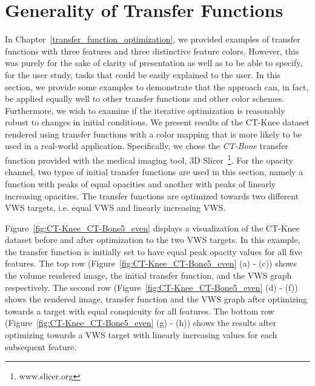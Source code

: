 \chapter{Generality of Transfer Functions \label{Generality_of_TF}}

In Chapter~\ref{transfer_function_optimization}, we provided examples of transfer functions with three features and three distinctive feature colors. However, this was 
purely for the sake of clarity of presentation as well as to be able to specify, for the user study, tasks that could be easily explained to the user. In this section, we provide some examples to demonstrate that the approach can, in fact, be applied equally well to other transfer functions and other color schemes. Furthermore, we wish to examine if the iterative optimization is reasonably robust to changes in initial conditions. 
We present results of the CT-Knee dataset rendered using transfer functions with a color mapping that is more likely to be used in a real-world application. Specifically, we chose the \emph{CT-Bone} transfer function provided with the medical imaging tool, 3D Slicer~\footnote{www.slicer.org}. For the opacity channel, two types of initial transfer functions are used in this section, namely a function with peaks of equal opacities and another with peaks of linearly increasing opacities. The transfer functions are optimized towards two different VWS targets, i.e. equal VWS and linearly increasing VWS.


Figure~\ref{fig:CT-Knee_CT-Bone5_even} displays a visualization of the CT-Knee dataset before and after optimization to the two VWS targets. In this example, the transfer function is initially set to have equal peak opacity values for all five features. The top row (Figure~\ref{fig:CT-Knee_CT-Bone5_even} (a) - (c)) shows the volume rendered image, the initial transfer function, and the VWS graph respectively. The second row (Figure~\ref{fig:CT-Knee_CT-Bone5_even} (d) - (f))  shows the rendered image, transfer function and the VWS graph after optimizing towards a target with equal conspicuity for all features. The bottom row (Figure~\ref{fig:CT-Knee_CT-Bone5_even} (g) - (h))  shows the results after optimizing towards a VWS target with linearly increasing values for each subsequent feature.


